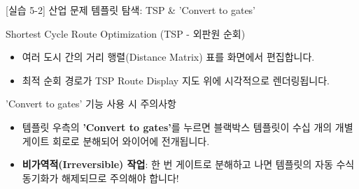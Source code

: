 \documentclass[aspectratio=169, 10pt]{beamer}
\begin{document}
\begin{frame}{[실습 5-2] 산업 문제 템플릿 탐색: TSP \& 'Convert to gates'}
    \begin{qcblock}{Shortest Cycle Route Optimization (TSP - 외판원 순회)}
        \begin{itemize}
            \item 여러 도시 간의 거리 행렬(Distance Matrix) 표를 화면에서 편집합니다.
            \pause
            \item 최적 순회 경로가 TSP Route Display 지도 위에 시각적으로 렌더링됩니다.
        \end{itemize}
    \end{qcblock}
    \vspace{0.2cm}
    \begin{qcalert}{{'Convert to gates' 기능 사용 시 주의사항}}
        \begin{itemize}
            \item 템플릿 우측의 \textbf{'Convert to gates'}를 누르면 블랙박스 템플릿이 수십 개의 개별 게이트 회로로 분해되어 와이어에 전개됩니다.
            \pause
            \item \textbf{비가역적(Irreversible) 작업}: 한 번 게이트로 분해하고 나면 템플릿의 자동 수식 동기화가 해제되므로 주의해야 합니다!
        \end{itemize}
    \end{qcalert}
\end{frame}
\end{document}
